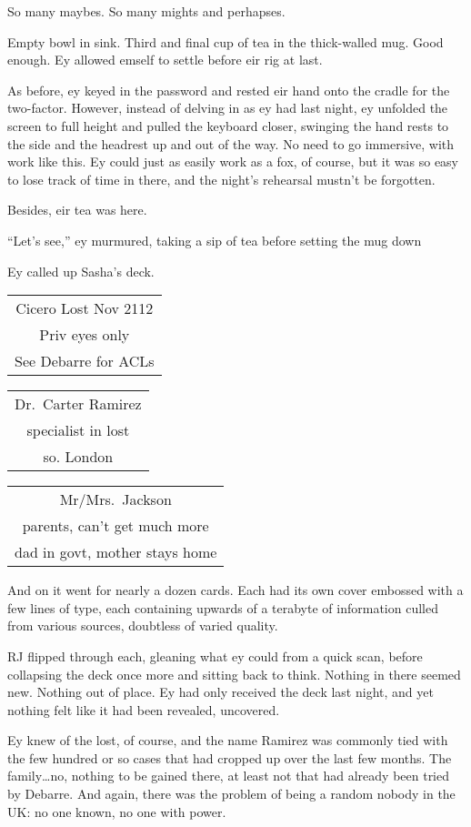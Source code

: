 So many maybes. So many mights and perhapses.

Empty bowl in sink. Third and final cup of tea in the thick-walled mug. Good enough. Ey allowed emself to settle before eir rig at last.

As before, ey keyed in the password and rested eir hand onto the cradle for the two-factor. However, instead of delving in as ey had last night, ey unfolded the screen to full height and pulled the keyboard closer, swinging the hand rests to the side and the headrest up and out of the way. No need to go immersive, with work like this. Ey could just as easily work as a fox, of course, but it was so easy to lose track of time in there, and the night's rehearsal mustn't be forgotten.

Besides, eir tea was here.

``Let's see,'' ey murmured, taking a sip of tea before setting the mug down

Ey called up Sasha's deck.

\begin{longtable}[]{@{}c@{}}
\toprule
\endhead
Cicero Lost Nov 2112\tabularnewline
Priv eyes only\tabularnewline
See Debarre for ACLs\tabularnewline
\bottomrule
\end{longtable}

\begin{longtable}[]{@{}c@{}}
\toprule
\endhead
Dr.~Carter Ramirez\tabularnewline
specialist in lost\tabularnewline
so. London\tabularnewline
\bottomrule
\end{longtable}

\begin{longtable}[]{@{}c@{}}
\toprule
\endhead
Mr/Mrs.~Jackson\tabularnewline
parents, can't get much more\tabularnewline
dad in govt, mother stays home\tabularnewline
\bottomrule
\end{longtable}

And on it went for nearly a dozen cards. Each had its own cover embossed with a few lines of type, each containing upwards of a terabyte of information culled from various sources, doubtless of varied quality.

RJ flipped through each, gleaning what ey could from a quick scan, before collapsing the deck once more and sitting back to think. Nothing in there seemed new. Nothing out of place. Ey had only received the deck last night, and yet nothing felt like it had been revealed, uncovered.

Ey knew of the lost, of course, and the name Ramirez was commonly tied with the few hundred or so cases that had cropped up over the last few months. The family\ldots{}no, nothing to be gained there, at least not that had already been tried by Debarre. And again, there was the problem of being a random nobody in the UK: no one known, no one with power.

